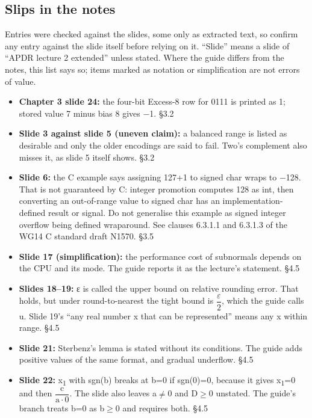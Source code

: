 \documentclass[11pt]{article}
\begin{document}
\begin{keepsection}
\section{Slips in the notes}

Entries were checked against the slides, some only as extracted text, so confirm any entry against the slide itself before relying on it. “Slide” means a slide of “APDR lecture 2 extended” unless stated. Where the guide differs from the notes, this list says so; items marked as notation or simplification are not errors of value.

\begin{itemize}
\item \textbf{Chapter 3 slide 24:} the four-bit Excess-8 row for 0111 is printed as 1; stored value 7 minus bias 8 gives \ensuremath{-}1. \hfill{\small\color{FAUblue}§3.2}
\item \textbf{Slide 3 against slide 5 (uneven claim):} a balanced range is listed as desirable and only the older encodings are said to fail. Two’s complement also misses it, as slide 5 itself shows. \hfill{\small\color{FAUblue}§3.2}
\item \textbf{Slide 6:} the C example says assigning 127+1 to signed char wraps to \ensuremath{-}128. That is not guaranteed by C: integer promotion computes 128 as int, then converting an out-of-range value to signed char has an implementation-defined result or signal. Do not generalise this example as signed integer overflow being defined wraparound. See clauses 6.3.1.1 and 6.3.1.3 of the WG14 C standard draft N1570. \hfill{\small\color{FAUblue}§3.5}
\item \textbf{Slide 17 (simplification):} the performance cost of subnormals depends on the CPU and its mode. The guide reports it as the lecture’s statement. \hfill{\small\color{FAUblue}§4.5}
\item \textbf{Slides 18–19:} ε is called the upper bound on relative rounding error. That holds, but under round-to-nearest the tight bound is {\small\ensuremath{\dfrac{ε}{2}}}, which the guide calls u. Slide 19’s “any real number x that can be represented” means any x within range. \hfill{\small\color{FAUblue}§4.5}
\item \textbf{Slide 21:} Sterbenz’s lemma is stated without its conditions. The guide adds positive values of the same format, and gradual underflow. \hfill{\small\color{FAUblue}§4.5}
\item \textbf{Slide 22:} x\textsubscript{1} with sgn(b) breaks at b=0 if sgn(0)=0, because it gives x\textsubscript{1}=0 and then {\small\ensuremath{\dfrac{\mathrm{c}}{\mathrm{a}\cdot 0}}}. The slide also leaves a\ensuremath{\neq}0 and D\ensuremath{\geq}0 unstated. The guide’s branch treats b=0 as b\ensuremath{\geq}0 and requires both. \hfill{\small\color{FAUblue}§4.5}

\end{itemize}
\end{keepsection}
\end{document}
